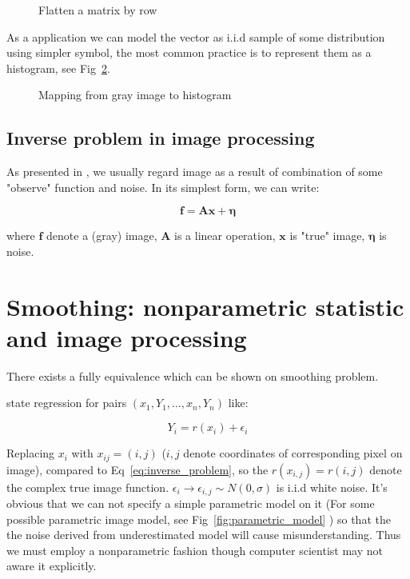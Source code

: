 \documentclass{article}
\begin{document}
\begin{figure}[htb]
  \centering
  
  \caption{Flatten a matrix by row}
  \label{fig:flatten_matrix}
\end{figure}


As a application we can model the vector as i.i.d sample of some distribution using simpler symbol, the most 
common practice is to represent them as a histogram, see Fig~\ref{fig:map_gray_to_hist}.

\begin{figure}[htb]
  \centering
  
  \caption{Mapping from gray image to histogram}
  \label{fig:map_gray_to_hist}
\end{figure}

\subsection{Inverse problem in image processing}

As presented in \cite{dong2015image}, we usually regard image as a result of combination of some "observe"
function and noise. In its simplest form, we can write:

\begin{equation}
\mathbf{f} = \mathbf{A} \mathbf{x} + \mathbf{\eta}
\label{eq:inverse_problem}
\end{equation}

where $\mathbf{f}$ denote a (gray) image, $\mathbf{A}$ is a linear operation, $\mathbf{x}$ is "true" image,
$\mathbf{\eta}$ is noise.
 
\section{Smoothing: nonparametric statistic and image processing}

There exists a fully equivalence which can be shown on smoothing problem.

\cite{wasserman2006all} state regression for pairs $(x_1,Y_1,\dots,x_n,Y_n)$ like:

$$
Y_i = r(x_i) + \epsilon_i
$$

Replacing $x_i$ with $x_{ij}=(i,j)$ ($i,j$ denote coordinates of corresponding pixel on image), compared to Eq~\ref{eq:inverse_problem},
so the $r(x_{i,j})=r(i,j)$ denote the complex true image function. $\epsilon_i \to \epsilon_{i,j} \sim N(0,\sigma)$ is i.i.d white noise.
It's obvious that we can not specify a simple parametric model on it (For some possible parametric image model,
see Fig~\ref{fig:parametric_model} ) so that the the noise derived from underestimated model will cause misunderstanding. 
Thus we must employ a nonparametric fashion though computer scientist may not aware it explicitly.
\end{document}
